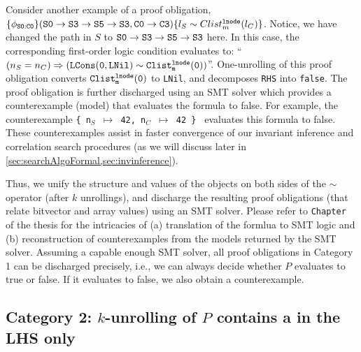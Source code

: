 Consider another example of a proof obligation,
$\{\phi_{{\tt S0:C0}}\} ({\tt S0\rightarrow S3\rightarrow S5\rightarrow S3}, \\{\tt C0\rightarrow C3}) \{l_{S}\sim{}Clist^{{\tt lnode}}_{m}(l_{C})\}$.
Notice, we have changed the path in $S$ to ${\tt S0\rightarrow S3\rightarrow S5\rightarrow S3}$ here.
In this case, the corresponding first-order logic condition evaluates
to: ``$(n_S=n_C)\Rightarrow({\tt LCons(0, LNil)}\sim{}{\tt Clist^{{\tt lnode}}_{m}(0)})$''.
One-unrolling of this proof obligation converts
${\tt Clist^{{\tt lnode}}_{m}(0)}$ to {\tt LNil}, and
decomposes {\tt RHS} into {\tt false}.
The proof obligation is further discharged using an SMT solver
which provides a counterexample (model) that evaluates the
formula to false. For example, the counterexample {\tt \{ n$_S$ $\mapsto$ 42, n$_C$ $\mapsto$ 42 \} }
evaluates this formula to false.
These counterexamples
assist in faster convergence
of our invariant inference and correlation search procedures (as we will discuss later in \cref{sec:searchAlgoFormal,sec:invinference}).

Thus, we unify the structure and
values of the \SpecL{} objects on both sides of
the $\sim$ operator (after $k$ unrollings), and discharge the resulting
proof obligations (that relate bitvector and array values) using an SMT solver.
Please refer to {\tt Chapter \ThesisChapterAlgo{}} of the thesis for
the intricacies of (a) translation of the formlua to SMT logic and (b) reconstruction
of counterexamples from the models returned by the SMT solver.
Assuming a capable enough SMT solver,
all proof obligations in Category 1 can be discharged precisely, i.e.,
we can always decide whether $P$ evaluates to true or false. If it
evaluates to false, we also obtain a counterexample.



\subsection[Handling Category 2 Proof Obligations]{Category 2: $k$-unrolling of $P$
contains a \recursiveRelation{} in the LHS only}
\label{sec:cat2}

